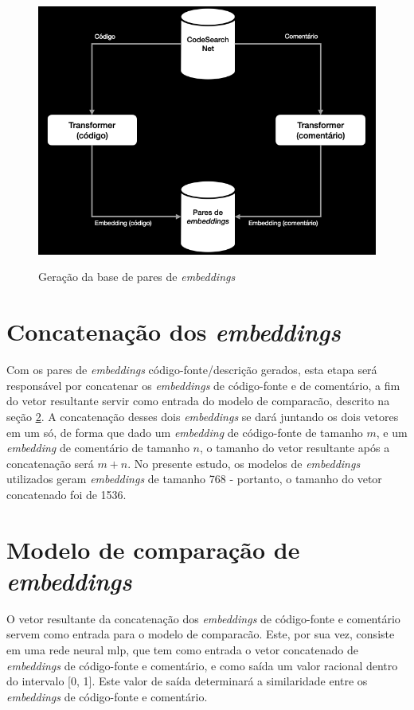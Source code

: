 \begin{figure}[H]
    \centering
        \caption{Geração da base de pares de \textit{embeddings}}
        \includegraphics[scale=0.5]{db_embeddings.png}
        \label{fig:metodology-db-embeddings}
\end{figure}


\section{Concatenação dos \textit{embeddings}} 
\label{sec:methodology:embeddings-concat}
Com os pares de \textit{embeddings} código-fonte/descrição gerados, esta etapa será responsável por concatenar os \textit{embeddings} de código-fonte e de comentário, a fim do vetor resultante servir como entrada do modelo de comparacão, descrito na seção \ref{sec:methodology:embedding-comparator}.
A concatenação desses dois \textit{embeddings} se dará juntando os dois vetores em um só, de forma que dado um \textit{embedding} de código-fonte de tamanho $m$, e um \textit{embedding} de comentário de tamanho $n$, o tamanho do vetor resultante após a concatenação será $m + n$. No presente estudo, os modelos de \textit{embeddings} utilizados geram \textit{embeddings} de tamanho 768 - portanto, o tamanho do vetor concatenado foi de 1536.

\section{Modelo de comparação de \textit{embeddings}}
\label{sec:methodology:embedding-comparator}
O vetor resultante da concatenação dos \textit{embeddings} de código-fonte e comentário servem como entrada para o modelo de comparacão. Este, por sua vez, consiste em uma rede neural \gls{mlp}, que tem como entrada o vetor concatenado de \textit{embeddings} de código-fonte e comentário, e como saída um valor racional dentro do intervalo [0, 1]. Este valor de saída determinará a similaridade entre os \textit{embeddings} de código-fonte e comentário.

